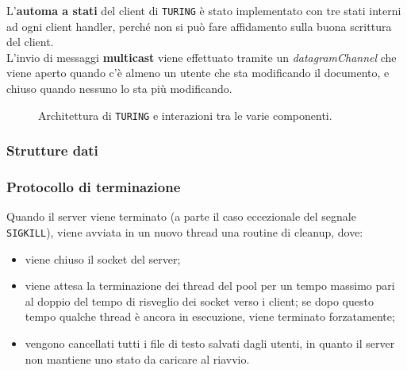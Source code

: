 L'\textbf{automa a stati} del client di \texttt{TURING} è stato implementato con tre stati interni ad ogni client handler, perché non si può fare affidamento sulla buona scrittura del client.
\medskip \\
L'invio di messaggi \textbf{multicast} viene effettuato tramite un \textit{datagramChannel} che viene aperto quando c'è almeno un utente che sta modificando il documento, e chiuso quando nessuno lo sta più modificando.

\newpage

\begin{center}
	\begin{figure}[ht!]
		\caption{Architettura di \texttt{TURING} e interazioni tra le varie componenti.}
	\end{figure}
\end{center}

\subsubsection{Strutture dati}


\subsubsection{Protocollo di terminazione}
\sloppy
Quando il server viene terminato (a parte il caso eccezionale del segnale \texttt{SIGKILL}), viene avviata in un nuovo thread una routine di cleanup, dove:
\begin{itemize}
	\item viene chiuso il socket del server;
	\item viene attesa la terminazione dei thread del pool per un tempo massimo pari al doppio del tempo di risveglio dei socket verso i client; se dopo questo tempo qualche thread è ancora in esecuzione, viene terminato forzatamente;
	\item vengono cancellati tutti i file di testo salvati dagli utenti, in quanto il server non mantiene uno stato da caricare al riavvio.
\end{itemize}


